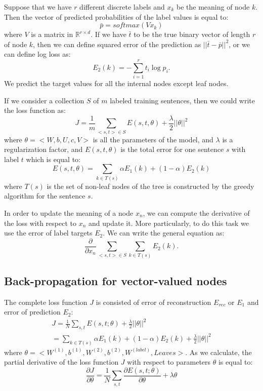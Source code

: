 \documentclass[twoside,12pt]{article}
\begin{document}
Suppose that we have $r$ different discrete labels and $x_k$ be the meaning of node $k$. Then the vector of predicted probabilities of the label values is equal to:
\begin{equation}
\bar{p}=softmax(Vx_k)
\end{equation}
where $V$ is a matrix in $\mathbb{R}^{r\times d}$. If we have $\bar{t}$ to be the true binary vector of length $r$ of node $k$, then we can define squared error of the prediction as $||\bar{t}-\bar{p}||^2$, or we can define log loss as:
\begin{equation}
E_2(k)=-\sum_{i=1}^{r}t_i\log{p_i}.
\end{equation}
We predict the target values for all the internal nodes except leaf nodes. 

If we consider a collection $S$ of $m$ labeled training sentences, then we could write the loss function as:
\begin{equation}
J=\frac{1}{m}\sum_{<s,t> \in S}E(s,t,\theta)+\frac{\lambda}{2}||\theta||^2
\end{equation}
where $\theta=<W,b,U,c,V>$ is all the parameters of the model, and $\lambda$ is a regularization factor, and $E(s,t,\theta)$ is the total error for one sentence $s$ with label $t$ which is equal to:
\begin{equation}
E(s,t,\theta)=\sum_{k \in T(s)}\alpha E_1(k)+(1-\alpha)E_2(k)
\end{equation}
where $T(s)$ is the set of non-leaf nodes of the tree is constructed by the greedy algorithm for the sentence $s$. 

In order to update the meaning of a node $x_n$, we can compute the derivative of the loss with respect to $x_n$ and update it. More particularly, to do this task we use the error of label targets $E_2$. We can write the general equation as:
\begin{equation}
\frac{\partial}{\partial x_n}\sum_{<s,t>\in S}\sum_{k \in T(s)}E_2(k).
\end{equation}
\subsection{Back-propagation for vector-valued nodes}
The complete loss function $J$ is consisted of error of reconstruction $E_{rec}$ or $E_1$ and error of prediction $E_2$:
\begin{align}
J=\frac{1}{N}\sum_{s,t}E(s,t;\theta)+\frac{\lambda}{2}||\theta||^2\\
=\sum_{k \in T(s)}\alpha E_1(k)+(1-\alpha)E_2(k)+\frac{\lambda}{2}||\theta||^2
\end{align}
where $\theta=<W^{(1)},b^{(1)},W^{(2)},b^{(2)},W^{(label)},Leaves>$. As we calculate, the partial derivative of the loss function $J$ with respect to parameters $\theta$ is equal to:
\begin{equation}
\frac{\partial J}{\partial \theta}=\frac{1}{N}\sum_{s,t}\frac{\partial E(s,t;\theta)}{\partial \theta}+\lambda \theta
\end{equation}
\end{document}
